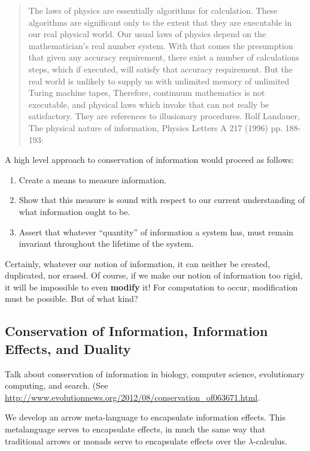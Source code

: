 \documentclass{article}
\newcommand{\lcal}{\ensuremath{\lambda}-calculus}
\begin{document}
\begin{quote}
  The laws of physics are essentially algorithms for calculation. These
  algorithms are significant only to the extent that they are executable in
  our real physical world. Our usual laws of physics depend on the
  mathematician's real number system. With that comes the presumption that
  given any accuracy requirement, there exist a number of calculations steps,
  which if executed, will satisfy that accuracy requirement. But the real
  world is unlikely to supply us with unlimited memory of unlimited Turing
  machine tapes, Therefore, continuum mathematics is not executable, and
  physical laws which invoke that can not really be satisfactory. They are
  references to illusionary procedures. Rolf Landauer, The physical nature of
  information, Physics Letters A 217 (1996) pp. 188-193:
\end{quote}

A high level approach to conservation of information would proceed
as follows:
\begin{enumerate}
\item Create a means to measure information.
\item Show that this measure is sound with respect to our current understanding
of what information ought to be.
\item Assert that whatever ``quantity'' of information a system has, must
remain invariant throughout the lifetime of the system.
\end{enumerate}

Certainly, whatever our notion of information, it can neither be created,
duplicated, nor erased. Of course, if we make our notion of information
too rigid, it will be impossible to even \textbf{modify} it! For computation
to occur, modification must be possible.  But of what kind?

\subsection{Conservation of Information, Information Effects, and Duality} 
 
Talk about conservation of information in biology, computer science,
evolutionary computing, and search. (See
\url{http://www.evolutionnews.org/2012/08/conservation_of063671.html}.

We develop an arrow meta-language to encapsulate information
effects. This metalanguage serves to encapsulate effects, in much the
same way that traditional arrows or monads serve to encapsulate
effects over the \lcal.
\end{document}
